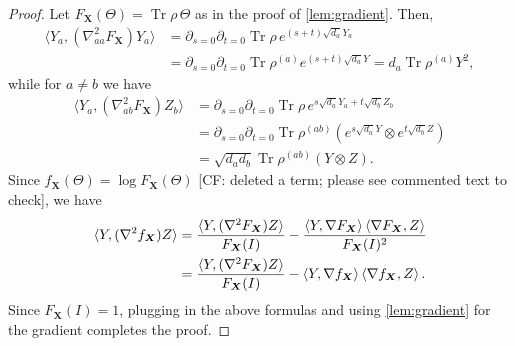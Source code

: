 \documentclass{article}
\DeclarePairedDelimiter{\norm}{\lVert}{\rVert}
\newcommand{\ot}{\otimes}
\renewcommand{\vec}{\bm}
\newcommand\tr{\operatorname{Tr}}
\newcommand{\CF}[1]{{\color{purple}[CF: #1]}}
\begin{document}
\begin{proof}
  Let $F_{\vec X}(\Theta) = \tr \rho \, \Theta$ as in the proof of \cref{lem:gradient}.
  Then,
  \begin{align*}
   \langle Y_a,  \left( \nabla^2_{aa} F_{\vec X} \right) Y_a \rangle
  &= \partial_{s=0} \partial_{t=0} \tr \rho \, e^{(s+t)\sqrt{d_a}  Y_a} \\
  &= \partial_{s=0} \partial_{t=0} \tr \rho^{(a)} e^{(s+t)  \sqrt{d_a}Y}
  = d_a \tr \rho^{(a)} Y^2,
  \end{align*}
  while for $a\neq b$ we have
  \begin{align*}
    \langle Y_a,  \left( \nabla^2_{ab} F_{\vec X} \right) Z_b \rangle
  &= \partial_{s=0} \partial_{t=0} \tr \rho \, e^{s \sqrt{d_a}Y_a + t \sqrt{d_b} Z_b} \\
  &= \partial_{s=0} \partial_{t=0} \tr \rho^{(ab)} \left( e^{s \sqrt{d_a}  Y} \ot e^{t \sqrt{d_b} Z} \right)\\
  &= \sqrt{d_a d_b} \tr \rho^{(ab)} \left( Y \ot Z \right).
  \end{align*}
  Since $f_{\vec X}(\Theta) = \log F_{\vec X}(\Theta)$ \CF{deleted a term; please see commented text to check}, we have
  \begin{align*}
    \braket{Y, (\nabla^2 f_{\vec X}) Z}
  &= \frac{\braket{Y, (\nabla^2 F_{\vec X}) Z}}{F_{\vec X}(I)} - \frac{\braket{Y, \nabla F_{\vec X}} \braket{\nabla F_{\vec X}, Z}}{F_{\vec X}(I)^2} \\
  &= \frac{\braket{Y, (\nabla^2 F_{\vec X}) Z}}{F_{\vec X}(I)} - \braket{Y, \nabla f_{\vec X}} \braket{\nabla f_{\vec X}, Z}.
  \end{align*}
  Since $F_{\vec X}(I)=1$, plugging in the above formulas and using \cref{lem:gradient} for the gradient completes the proof.
\end{proof}
\end{document}
